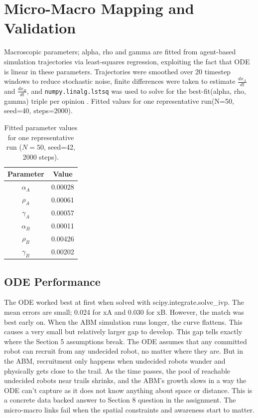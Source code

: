 \documentclass{article}
\begin{document}
\section{Micro-Macro Mapping and Validation}
Macroscopic parameters; alpha, rho and gamma are fitted from agent-based simulation  trajectories via least-squares regression, exploiting the fact that ODE is linear in these parameters. Trajectories were smoothed over 20 timestep windows to reduce stochastic noise, finite differences were taken to estimate  $\frac{dx_A}{dt}$ and 
$\frac{dx_B}{dt}$, and \texttt{numpy.linalg.lstsq} was used to solve for the best-fit(alpha, rho, gamma) triple per opinion . Fitted values for one representative run(N=50, seed=40, steps=2000).
\begin{table}[h]
\centering
\begin{tabular}{|c|c|}
\hline
\textbf{Parameter} & \textbf{Value} \\
\hline
$\alpha_A$ & 0.00028 \\
\hline
$\rho_A$   & 0.00061 \\
\hline
$\gamma_A$ & 0.00057 \\
\hline
$\alpha_B$ & 0.00011 \\
\hline
$\rho_B$   & 0.00426 \\
\hline
$\gamma_B$ & 0.00202 \\
\hline
\end{tabular}
\caption{Fitted parameter values for one representative run ($N=50$, seed=42, 2000 steps).}
\label{tab:params}
\end{table}

\subsection{ODE Performance}
The ODE worked best at first when solved with scipy.integrate.solve\_ivp. The mean errors are small; 0.024 for xA and 0.030 for xB. However, the match was best early on. When the ABM simulation runs longer, the curve flattens. This causes a very small but relatively larger gap to develop. 
This gap tells exactly where the Section 5 assumptions break. The ODE assumes that any committed robot can recruit from any undecided robot, no matter where they are. But in the ABM, recruitment only happens when undecided robots wander and physically gets close to the trail. As the time passes, the pool of reachable undecided robots near trails shrinks, and the ABM's growth slows in a way the ODE can't capture as it does not know anything about space or distance. 
This is a concrete data backed answer to Section 8 question in the assignment. The micro-macro links fail when the spatial constraints and awareness start to matter. 
\end{document}
